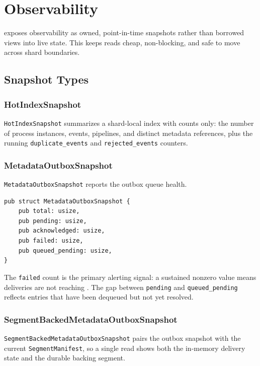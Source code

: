 \section{Observability}
\label{sec:observability}

\vannak{} exposes observability as owned, point-in-time snapshots rather than
borrowed views into live state. This keeps reads cheap, non-blocking, and safe
to move across shard boundaries.

\subsection{Snapshot Types}

\subsubsection{HotIndexSnapshot}

\texttt{HotIndexSnapshot} summarizes a shard-local index with counts only: the
number of process instances, events, pipelines, and distinct metadata
references, plus the running \texttt{duplicate\_events} and
\texttt{rejected\_events} counters.

\subsubsection{MetadataOutboxSnapshot}

\texttt{MetadataOutboxSnapshot} reports the outbox queue health.

\begin{lstlisting}
pub struct MetadataOutboxSnapshot {
    pub total: usize,
    pub pending: usize,
    pub acknowledged: usize,
    pub failed: usize,
    pub queued_pending: usize,
}
\end{lstlisting}

The \texttt{failed} count is the primary alerting signal: a sustained nonzero
value means deliveries are not reaching \ipto{}. The gap between \texttt{pending}
and \texttt{queued\_pending} reflects entries that have been dequeued but not yet
resolved.

\subsubsection{SegmentBackedMetadataOutboxSnapshot}

\texttt{SegmentBackedMetadataOutboxSnapshot} pairs the outbox snapshot with the
current \texttt{SegmentManifest}, so a single read shows both the in-memory
delivery state and the durable backing segment.

